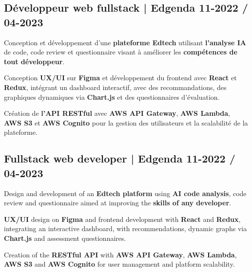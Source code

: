 {
\subsection{{Développeur web fullstack | Edgenda \hfill 11-2022 / 04-2023}}
\begin{zitemize}
    \item Conception et développement d'une \textbf{plateforme Edtech} utilisant \textbf{l'analyse IA} de code, code review et questionnaire visant à améliorer les \textbf{compétences de tout développeur}.
    \item Conception \textbf{UX/UI} sur \textbf{Figma} et développement du frontend avec \textbf{React} et \textbf{Redux}, intégrant un dashboard interactif, avec des recommandations, des graphiques dynamiques via \textbf{Chart.js} et des questionnaires d'évaluation.
    \item Création de \textbf{l'API RESTful} avec \textbf{AWS API Gateway}, \textbf{AWS Lambda}, \textbf{AWS S3} et \textbf{AWS Cognito} pour la gestion des utilisateurs et la scalabilité de la plateforme.
\end{zitemize}
}
{
\subsection{{Fullstack web developer | Edgenda \hfill 11-2022 / 04-2023}}
\begin{zitemize}
    \item Design and development of an \textbf{Edtech platform} using \textbf{AI code analysis}, code review and questionnaire aimed at improving the \textbf{skills of any developer}.
    \item \textbf{UX/UI} design on \textbf{Figma} and frontend development with \textbf{React} and \textbf{Redux}, integrating an interactive dashboard, with recommendations, dynamic graphs via \textbf{Chart.js} and assessment questionnaires.
    \item Creation of the \textbf{RESTful API} with \textbf{AWS API Gateway}, \textbf{AWS Lambda}, \textbf{AWS S3} and \textbf{AWS Cognito} for user management and platform scalability.
\end{zitemize}
}